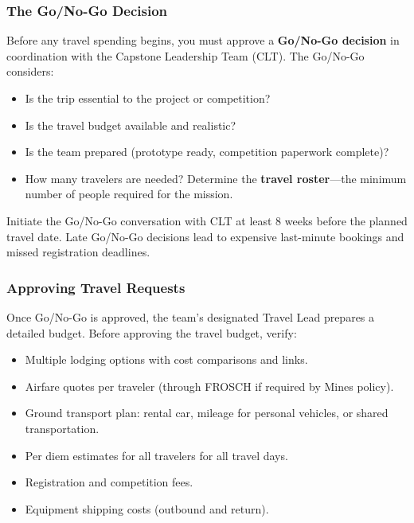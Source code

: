 \subsubsection{The Go/No-Go Decision}

Before any travel spending begins, you must approve a \textbf{Go/No-Go decision} in coordination with the Capstone Leadership Team (CLT). The Go/No-Go considers:

\begin{itemize}[nosep,leftmargin=1.5em]
\item Is the trip essential to the project or competition?
\item Is the travel budget available and realistic?
\item Is the team prepared (prototype ready, competition paperwork complete)?
\item How many travelers are needed? Determine the \textbf{travel roster}---the minimum number of people required for the mission.
\end{itemize}

\begin{paaction}
Initiate the Go/No-Go conversation with CLT at least 8 weeks before the planned travel date. Late Go/No-Go decisions lead to expensive last-minute bookings and missed registration deadlines.
\end{paaction}

\subsubsection{Approving Travel Requests}

Once Go/No-Go is approved, the team's designated Travel Lead prepares a detailed budget. Before approving the travel budget, verify:

\begin{itemize}[nosep,leftmargin=1.5em]
\item Multiple lodging options with cost comparisons and links.
\item Airfare quotes per traveler (through FROSCH if required by Mines policy).
\item Ground transport plan: rental car, mileage for personal vehicles, or shared transportation.
\item Per diem estimates for all travelers for all travel days.
\item Registration and competition fees.
\item Equipment shipping costs (outbound and return).
\end{itemize}

